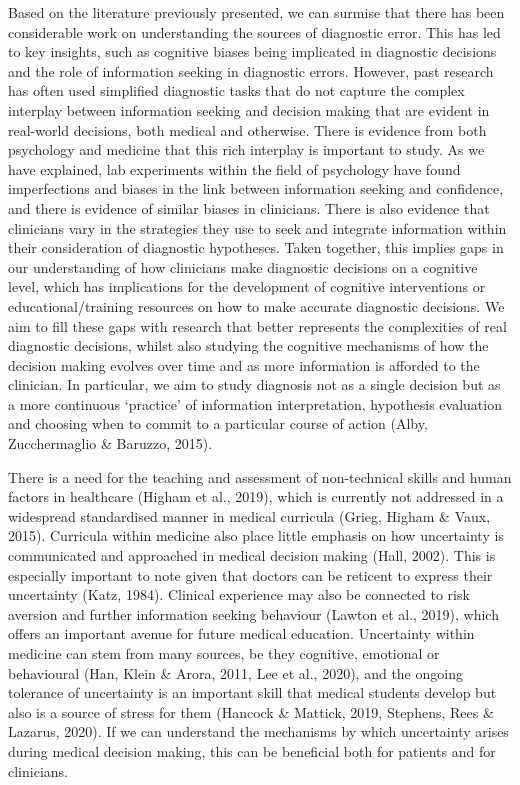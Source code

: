 \documentclass[a4paper, nobind]{templates/ociamthesis}
\begin{document}
Based on the literature previously presented, we can surmise that there has been considerable work on understanding the sources of diagnostic error. This has led to key insights, such as cognitive biases being implicated in diagnostic decisions and the role of information seeking in diagnostic errors. However, past research has often used simplified diagnostic tasks that do not capture the complex interplay between information seeking and decision making that are evident in real-world decisions, both medical and otherwise. There is evidence from both psychology and medicine that this rich interplay is important to study. As we have explained, lab experiments within the field of psychology have found imperfections and biases in the link between information seeking and confidence, and there is evidence of similar biases in clinicians. There is also evidence that clinicians vary in the strategies they use to seek and integrate information within their consideration of diagnostic hypotheses. Taken together, this implies gaps in our understanding of how clinicians make diagnostic decisions on a cognitive level, which has implications for the development of cognitive interventions or educational/training resources on how to make accurate diagnostic decisions. We aim to fill these gaps with research that better represents the complexities of real diagnostic decisions, whilst also studying the cognitive mechanisms of how the decision making evolves over time and as more information is afforded to the clinician. In particular, we aim to study diagnosis not as a single decision but as a more continuous `practice' of information interpretation, hypothesis evaluation and choosing when to commit to a particular course of action (Alby, Zucchermaglio \& Baruzzo, 2015).

\hfill\break
There is a need for the teaching and assessment of non-technical skills and human factors in healthcare (Higham et al., 2019), which is currently not addressed in a widespread standardised manner in medical curricula (Grieg, Higham \& Vaux, 2015). Curricula within medicine also place little emphasis on how uncertainty is communicated and approached in medical decision making (Hall, 2002). This is especially important to note given that doctors can be reticent to express their uncertainty (Katz, 1984). Clinical experience may also be connected to risk aversion and further information seeking behaviour (Lawton et al., 2019), which offers an important avenue for future medical education. Uncertainty within medicine can stem from many sources, be they cognitive, emotional or behavioural (Han, Klein \& Arora, 2011, Lee et al., 2020), and the ongoing tolerance of uncertainty is an important skill that medical students develop but also is a source of stress for them (Hancock \& Mattick, 2019, Stephens, Rees \& Lazarus, 2020). If we can understand the mechanisms by which uncertainty arises during medical decision making, this can be beneficial both for patients and for clinicians.
\end{document}
